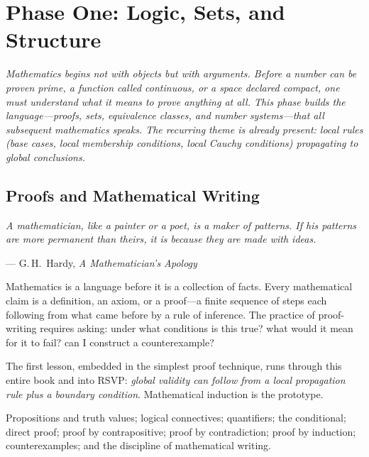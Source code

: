\documentclass[12pt, twoside, openright, a4paper]{book}
\newcommand{\sidenote}[1]{\marginnote{#1}}
\newcommand{\chapterepigraph}[2]{%
  \vspace{-8pt}\begin{center}\begin{minipage}{0.78\textwidth}
  \small\itshape #1\begin{flushright}--- #2\end{flushright}
  \end{minipage}\end{center}\vspace{10pt}}
\newcommand{\partintro}[1]{%
  \begin{tcolorbox}[enhanced, colback=RSVPdeep, colframe=RSVPdeep, coltext=white,
    arc=6pt, boxrule=0pt, left=8mm, right=8mm, top=6mm, bottom=6mm]
  \large\itshape #1\end{tcolorbox}}
\begin{document}
\mainmatter

\part{Phase One: Logic, Sets, and Structure}

\partintro{Mathematics begins not with objects but with arguments. Before a
number can be proven prime, a function called continuous, or a space declared
compact, one must understand what it means to prove anything at all. This phase
builds the language---proofs, sets, equivalence classes, and number
systems---that all subsequent mathematics speaks. The recurring theme is already
present: local rules (base cases, local membership conditions, local Cauchy
conditions) propagating to global conclusions.}

\chapter{Proofs and Mathematical Writing}
\chapterepigraph{A mathematician, like a painter or a poet, is a maker of patterns.
If his patterns are more permanent than theirs, it is because they are made with ideas.}{G.\,H.\ Hardy, \textit{A Mathematician's Apology}}
\sidenote{Recommended:\\Velleman,\\\textit{How to Prove It}}
\label{ch:proofs}

\begin{motivation}
Mathematics is a language before it is a collection of facts.
Every mathematical claim is a definition, an axiom, or a proof---a finite sequence of steps each following from what came before by a rule of inference.
The practice of proof-writing requires asking: under what conditions is this true? what would it mean for it to fail? can I construct a counterexample?

The first lesson, embedded in the simplest proof technique, runs through this entire book and into RSVP: \emph{global validity can follow from a local propagation rule plus a boundary condition}.
Mathematical induction is the prototype.
\end{motivation}

\begin{structures}
Propositions and truth values; logical connectives; quantifiers; the conditional; direct proof; proof by contrapositive; proof by contradiction; proof by induction; counterexamples; and the discipline of mathematical writing.
\end{structures}
\end{document}
